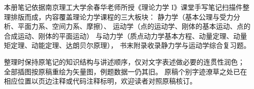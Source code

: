 本册笔记依据南京理工大学余春华老师所授《理论力学 I》课堂手写笔记扫描件整理排版而成，内容覆盖理论力学课程的三大板块：
静力学（基本公理与受力分析、平面力系、空间力系、摩擦）、
运动学（点的运动学、刚体的基本运动、点的合成运动、刚体的平面运动）
与动力学（质点动力学基本方程、动量定理、动量矩定理、动能定理、达朗贝尔原理），
书末附录收录静力学与运动学综合复习题。

整理时保持原笔记的知识结构与讲述顺序，仅对文字表述做必要的连贯性润色；
全部插图按原稿重绘为矢量图，例题数据一仍其旧。
原稿个别字迹潦草之处已在相应位置以页边注释或代码注释标明，欢迎读者对照原稿核订。
